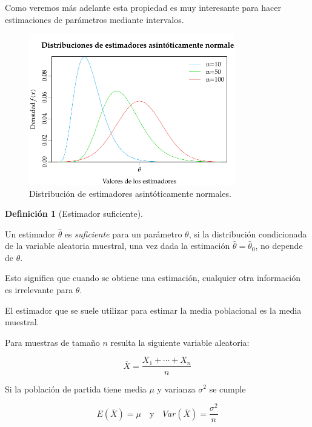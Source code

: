 \documentclass[
  a4paper,
]{scrreport}
\theoremstyle{definition}
\newtheorem{definition}{Definición}[chapter]
\theoremstyle{definition}
\theoremstyle{plain}
\theoremstyle{remark}
\begin{document}
Como veremos más adelante esta propiedad es muy interesante para hacer
estimaciones de parámetros mediante intervalos.

\begin{figure}

{\centering \includegraphics[width=0.8\textwidth,height=\textheight]{img/estimacion/estimador-asintoticamente-normal.pdf}

}

\caption{Distribución de estimadores asintóticamente normales.}

\end{figure}

\begin{definition}[Estimador
suficiente]\protect\hypertarget{def-estimador-suficiente}{}\label{def-estimador-suficiente}

Un estimador \(\hat \theta\) es \emph{suficiente} para un parámetro
\(\theta\), si la distribución condicionada de la variable aleatoria
muestral, una vez dada la estimación \(\hat \theta = \hat \theta_0\), no
depende de \(\theta\).

\end{definition}

Esto significa que cuando se obtiene una estimación, cualquier otra
información es irrelevante para \(\theta\).

El estimador que se suele utilizar para estimar la media poblacional es
la media muestral.

Para muestras de tamaño \(n\) resulta la siguiente variable aleatoria:

\[
\bar X = \frac{X_1+\cdots+X_n}{n}
\]

Si la población de partida tiene media \(\mu\) y varianza \(\sigma^2\)
se cumple

\[
E(\bar X) = \mu \quad \mbox{y} \quad Var(\bar X)=\frac{\sigma^2}{n}
\]
\end{document}
